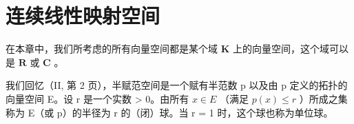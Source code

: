 \chapter{连续线性映射空间}

在本章中，我们所考虑的所有向量空间都是某个域 \(\mathbf{K}\) 上的向量空间，这个域可以是 \(\mathbf{R}\) 或 \(\mathbf{C}\) 。

我们回忆（II, 第 2 页），半赋范空间是一个赋有半范数 p 以及由 p 定义的拓扑的向量空间 E。设 r 是一个实数 \textgreater{} 0。由所有 \(x \in E\) （满足 \(p(x) \leqslant r\) ）所成之集称为 E（或 p）的半径为 r 的（闭）球。当 r = 1 时，这个球也称为单位球。

